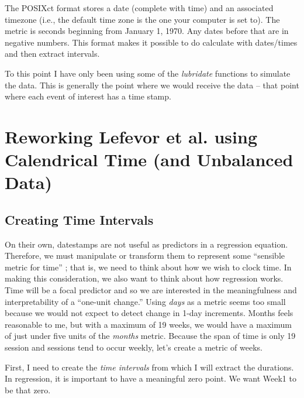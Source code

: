 \documentclass[
  english,
]{book}
\begin{document}
The POSIXct format stores a date (complete with time) and an associated timezone (i.e., the default time zone is the one your computer is set to). The metric is seconds beginning from January 1, 1970. Any dates before that are in negative numbers. This format makes it possible to do calculate with dates/times and then extract intervals.

To this point I have only been using some of the \emph{lubridate} functions to simulate the data. This is generally the point where we would receive the data -- that point where each event of interest has a time stamp.

\hypertarget{reworking-lefevor-et-al.--lefevor_religious_2017-using-calendrical-time-and-unbalanced-data}{%
\section{\texorpdfstring{Reworking Lefevor et al. \citeyearpar{lefevor_religious_2017} using Calendrical Time (and Unbalanced Data)}{Reworking Lefevor et al. {[}-@lefevor\_religious\_2017{]} using Calendrical Time (and Unbalanced Data)}}\label{reworking-lefevor-et-al.--lefevor_religious_2017-using-calendrical-time-and-unbalanced-data}}

\hypertarget{creating-time-intervals}{%
\subsection{Creating Time Intervals}\label{creating-time-intervals}}

On their own, datestamps are not useful as predictors in a regression equation. Therefore, we must manipulate or transform them to represent some ``sensible metric for time'' \citep{singer_applied_2003}; that is, we need to think about how we wish to clock time. In making this consideration, we also want to think about how regression works. Time will be a focal predictor and so we are interested in the meaningfulness and interpretability of a ``one-unit change.'' Using \emph{days} as a metric seems too small because we would not expect to detect change in 1-day increments. Months feels reasonable to me, but with a maximum of 19 weeks, we would have a maximum of just under five units of the \emph{months} metric. Because the span of time is only 19 session and sessions tend to occur weekly, let's create a metric of weeks.

First, I need to create the \emph{time intervals} from which I will extract the durations. In regression, it is important to have a meaningful zero point. We want Week1 to be that zero.
\end{document}
